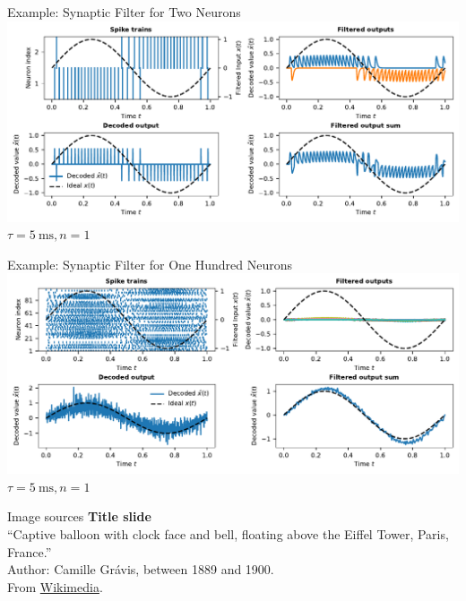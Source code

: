 \documentclass[handout,aspectratio=169]{beamer}
\begin{document}
\begin{frame}{Example: Synaptic Filter for Two Neurons}
	\includegraphics[width=\textwidth]{media/two_neurons_synaptic_filter.pdf}\\
	\centering $\tau = \SI{5}{\milli\second}, n = 1$
\end{frame}

\begin{frame}{Example: Synaptic Filter for One Hundred Neurons}
	\includegraphics[width=\textwidth]{media/n_neurons_synaptic_filter.pdf}
	\centering $\tau = \SI{5}{\milli\second}, n = 1$
\end{frame}

\backupbegin

\begin{frame}[noframenumbering]{Image sources}
	\small
	\textbf{Title slide}\\\enquote{Captive balloon with clock face and bell, floating above the Eiffel Tower, Paris, France.}\\Author: Camille Grávis, between 1889 and 1900.\\From \href{https://commons.wikimedia.org/wiki/File:Camille_Gr\%C3\%A1vis,_Captive_balloon_with_clock_face_and_bell,_floating_above_the_Eiffel_Tower,_Paris,_France.jpg}{Wikimedia}.
\end{frame}


\backupend
\end{document}
